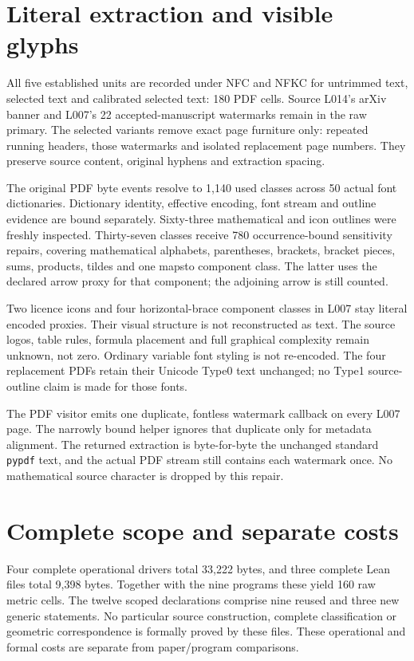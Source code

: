 \documentclass[a4paper,11pt]{article}
\begin{document}
\newpage
\section*{Literal extraction and visible glyphs}
All five established units are recorded under NFC and NFKC for untrimmed text,
selected text and calibrated selected text: 180 PDF cells. Source L014's arXiv
banner and L007's 22 accepted-manuscript watermarks remain in the raw primary.
The selected variants remove exact page furniture only: repeated running
headers, those watermarks and isolated replacement page numbers. They preserve
source content, original hyphens and extraction spacing.

The original PDF byte events resolve to 1,140 used classes across 50 actual
font dictionaries. Dictionary identity, effective encoding, font stream and
outline evidence are bound separately. Sixty-three mathematical and icon
outlines were freshly inspected. Thirty-seven classes receive 780
occurrence-bound sensitivity repairs, covering mathematical alphabets,
parentheses, brackets, bracket pieces, sums, products, tildes and one mapsto
component class. The latter uses the declared arrow proxy for that component;
the adjoining arrow is still counted.

Two licence icons and four horizontal-brace component classes in L007 stay
literal encoded proxies. Their visual structure is not reconstructed as text.
The source logos, table rules, formula placement and full graphical complexity
remain unknown, not zero. Ordinary variable font styling is not re-encoded.
The four replacement PDFs retain their Unicode Type0 text unchanged; no
Type1 source-outline claim is made for those fonts.

The PDF visitor emits one duplicate, fontless watermark callback on every
L007 page. The narrowly bound helper ignores that duplicate only for metadata
alignment. The returned extraction is byte-for-byte the unchanged standard
\texttt{pypdf} text, and the actual PDF stream still contains each watermark
once. No mathematical source character is dropped by this repair.

\section*{Complete scope and separate costs}
Four complete operational drivers total 33,222 bytes, and three complete
Lean files total 9,398 bytes. Together with the nine programs these yield
160 raw metric cells. The twelve scoped declarations comprise nine reused and
three new generic statements. No particular source construction, complete
classification or geometric correspondence is formally proved by these files.
These operational and formal costs are separate from paper/program comparisons.
\end{document}
